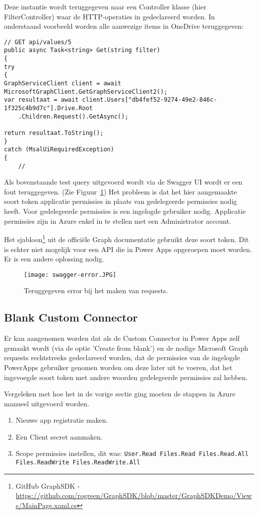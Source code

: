 Deze instantie wordt teruggegeven naar een Controller klasse (hier FilterController) waar de HTTP-operaties in gedeclareerd worden. In onderstaand voorbeeld worden alle aanwezige items in OneDrive teruggegeven:
\begin{lstlisting}[style=CSharpStyle]
// GET api/values/5
public async Task<string> Get(string filter)
{
try
{
GraphServiceClient client = await MicrosoftGraphClient.GetGraphServiceClient2();
var resultaat = await client.Users["db4fef52-9274-49e2-846c-1f325c4b9d7c"].Drive.Root
    .Children.Request().GetAsync();

return resultaat.ToString();
}
catch (MsalUiRequiredException)
{
    //
\end{lstlisting}

Als bovenstaande test query uitgevoerd wordt via de Swagger UI wordt er een fout teruggegeven. (Zie Figuur~\ref{fig:swagger-error})
Het probleem is dat het hier aangemaakte soort token applicatie permissies in plaats van gedelegeerde permissies nodig heeft. Voor gedelegeerde permissies is een ingelogde gebruiker nodig. Applicatie permissies zijn in Azure enkel in te stellen met een Administrator account.

Het sjabloon\footnote{GitHub GraphSDK - \url{https://github.com/rogreen/GraphSDK/blob/master/GraphSDKDemo/Views/MainPage.xaml.cs}} uit de officiële Graph documentatie gebruikt deze soort token.\autocite{MicrosoftDocs2020d} Dit is echter niet mogelijk voor een API die in Power Apps opgeroepen moet worden. Er is een andere oplossing nodig.

\begin{figure}[h!]
    \texttt{[image: swagger-error.JPG]}
    \caption{Teruggegeven error bij het maken van requests.}
    \label{fig:swagger-error}
\end{figure}

\subsection{Blank Custom Connector}

Er kan aangenomen worden dat als de Custom Connector in Power Apps zelf gemaakt wordt (via de optie 'Create from blank') en de nodige Microsoft Graph requests rechtstreeks gedeclareerd worden, dat de permissies van de ingelogde PowerApps gebruiker genomen worden om deze later uit te voeren, dat het ingevoegde soort token met andere woorden gedelegeerde permissies zal hebben.

Vergeleken met hoe het in de vorige sectie ging moeten de stappen in Azure manueel uitgevoerd worden.
\begin{enumerate}
    \item Nieuwe app registratie maken.
    \item Een Client secret aanmaken.
    \item Scope permissies instellen, dit was: \lstinline|User.Read Files.Read Files.Read.All Files.ReadWrite Files.ReadWrite.All|
\end{enumerate}

